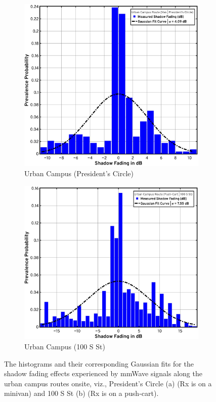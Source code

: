 \documentclass[12pt, draftcls, onecolumn]{IEEEtran}
\begin{document}
{\begin{figure} [t]
\begin{subfigure}{0.4815\linewidth}
         \includegraphics[width=1.0\linewidth]{figs/urban_campus_fading_1.pdf}
         \caption{Urban Campus (President's Circle)}
         \label{F9a}
     \end{subfigure}
     \begin{subfigure}{0.5085\linewidth}
         \centering
         \includegraphics[width=1.0\linewidth]{figs/urban_campus_fading_2.pdf}
         \caption{Urban Campus (100 S St)}
         \label{F9b}
     \end{subfigure}
     \vspace{-8mm}
     \caption{The histograms and their corresponding Gaussian fits for the shadow fading effects experienced by mmWave signals along the urban campus routes onsite, viz., President's Circle (a) (Rx is on a minivan) and 100 S St (b) (Rx is on a push-cart).}
     \label{F9}
\end{figure}

}
\end{document}
